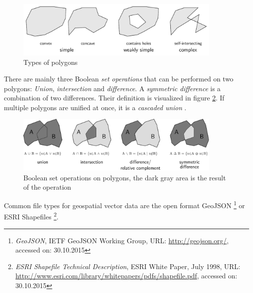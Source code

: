\begin{figure}[H]
  \centering
  \includegraphics[width=0.9\textwidth]{graphics/basics/hgis/polygon_properties}
  \caption{Types of polygons}
  \label{fig:polygon_properties}
\end{figure}

There are mainly three Boolean \emph{set operations} that can be performed on two polygons: \emph{Union}, \emph{intersection} and \emph{difference}. A \emph{symmetric difference} is a combination of two differences. Their definition is visualized in figure \ref{fig:polygon_operations}.
If multiple polygons are unified at once, it is a \emph{cascaded union}
\cite{bolstad2008gis}.

\begin{figure}[ht]
  \centering
  \includegraphics[width=0.9\textwidth]{graphics/basics/hgis/polygon_operations}
  \caption{Boolean set operations on polygons, the dark gray area is the result of the operation}
  \vspace{2.0em} %
  \label{fig:polygon_operations}
\end{figure}

Common file types for geospatial vector data are the open format GeoJSON
\footnote{
  \emph{GeoJSON},
  IETF GeoJSON Working Group,
  URL: \url{http://geojson.org/},
  accessed on: 30.10.2015
}
or ESRI Shapefiles
\footnote{
  \emph{ESRI Shapefile Technical Description},
  ESRI White Paper, July 1998,
  URL: \url{http://www.esri.com/library/whitepapers/pdfs/shapefile.pdf},
  accessed on: 30.10.2015
}.


